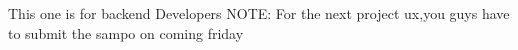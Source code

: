 This one is for backend Developers
NOTE:
For the next project ux,you guys have to submit the sampo on coming friday